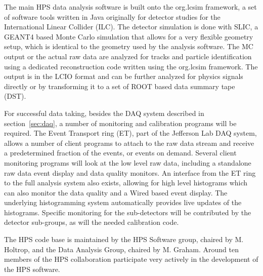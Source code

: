 %
\label{sec:software}

The main HPS data analysis software is built onto the org.lcsim framework, a set of software tools written in Java originally for detector studies for the International Linear Collider (ILC).
The detector simulation is done with SLIC, a GEANT4 based Monte Carlo simulation that allows for a very flexible geometry setup, which is identical to the geometry used by the analysis software. 
The MC output or the actual raw data are analyzed for tracks and particle identification using a dedicated reconstruction code written using the org.lcsim framework. 
The output is in the LCIO format and can be further analyzed for physics signals directly or by transforming it to a set of ROOT based data summary tape (DST). 

For successful data taking, besides the DAQ system described in section~\ref{sec:daq}, a number of monitoring and calibration programs will be required. The Event Transport ring (ET), part of the 
Jefferson Lab DAQ system, allows a number of client programs to attach to the raw data stream and receive a predetermined fraction of the events, or events on demand. 
Several client monitoring programs will look at the low level raw data, including a standalone raw data event display and data quality monitors. 
An interface from the ET ring to the full analysis system also exists, allowing for high level histograms which can also monitor the data quality and a Wired based event display. The underlying histogramming system automatically provides live updates of the histograms.
 Specific monitoring for the sub-detectors will be contributed by the detector sub-groups, as will the needed calibration code. 

The HPS code base is maintained by the HPS Software group, chaired by M. Holtrop, and the Data Analysis Group, chaired by M. Graham. Around ten members of the HPS collaboration participate very actively in the development of the HPS software. 
